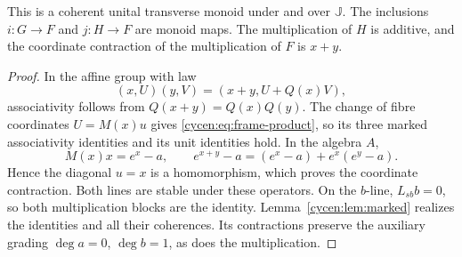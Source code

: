 \begin{lemma}\label{cycen:lem:frame-monoid}
This is a coherent unital transverse monoid under
and over $\mathbb J$. The inclusions
$i:G\to F$ and $j:H\to F$ are monoid maps.
The multiplication of $H$ is additive, and the
coordinate contraction of the multiplication of $F$
is $x+y$.
\end{lemma}
\begin{proof}
In the affine group with law
\[
 (x,U)(y,V)=(x+y,U+Q(x)V),
\]
associativity follows from $Q(x+y)=Q(x)Q(y)$.
The change of fibre coordinates $U=M(x)u$ gives
\eqref{cycen:eq:frame-product}, so its three
marked associativity identities and its unit
identities hold. In the algebra $A$,
\[
 M(x)x=e^x-a,\qquad
 e^{x+y}-a=(e^x-a)+e^x(e^y-a).
\]
Hence the diagonal $u=x$ is a homomorphism, which
proves the coordinate contraction. Both lines are
stable under these operators. On the $b$-line,
$L_{sb}b=0$, so both multiplication blocks are the
identity. Lemma~\ref{cycen:lem:marked} realizes the
identities and all their coherences. Its contractions
preserve the auxiliary grading
$\deg a=0$, $\deg b=1$, as does the multiplication.
\end{proof}

